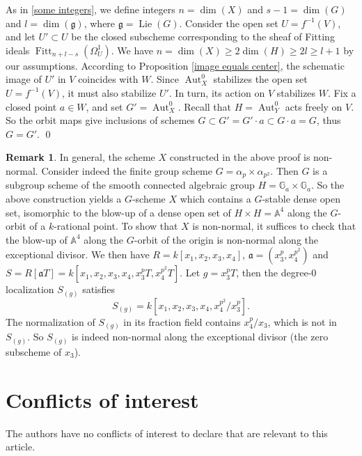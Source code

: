 \documentclass[oneside, 12pt]{amsart}
\theoremstyle{definition}
\newtheorem{remark}[theorem]{Remark}
\theoremstyle{remark}
\renewcommand{\AA}{\mathbb{A}}
\newcommand{\GG}{\mathbb{G}}
\newcommand{\ideala}{\mathfrak{a}}
\newcommand{\Aut}{\operatorname{Aut}}
\newcommand{\Fitt}{\operatorname{Fitt}}
\newcommand{\Lie}{\operatorname{Lie}}
\newcommand{\lieg}{\mathfrak{g}}
\begin{document}
As in \eqref{some integers}, we define integers  
$n=\dim(X)$ and $s-1=\dim(G)$ 
and $l=\dim(\lieg)$, where $\lieg=\Lie(G)$.
Consider the open set $U=f^{-1}(V)$, and let $U'\subset U$ 
be the closed subscheme corresponding 
to the sheaf of Fitting ideals $\Fitt_{n+ l-s}(\Omega^1_U)$. 
We have $n=\dim(X) \geq  2\dim(H)\geq 2l \geq l+1$ by our assumptions.
According to Proposition \ref{image equals center}, 
the schematic image of $U'$ in $V$ coincides with $W$.
Since $\Aut^0_X$ stabilizes the open set $U=f^{-1}(V)$, it must also stabilize $U'$.
In turn, its action on $V$ stabilizes $W$. 
Fix a closed point $a\in W$, and set $G'=\Aut_X^0$.
Recall that $H=\Aut_Y^0$ acts freely on $V$. 
So the orbit maps give inclusions of schemes 
$G\subset G'=G'\cdot a\subset G\cdot a=G$, thus $G=G'$.
\qed


\begin{remark}
\label{rem:nonnormal}
In general, the scheme $X$ constructed in the above proof 
is non-normal. Consider indeed the finite group scheme
$G = \alpha_p \times \alpha_{p^2}$. Then
$G$ is a subgroup scheme of the smooth connected algebraic 
group $H = \GG_a \times \GG_a$. So the above construction 
yields a $G$-scheme $X$ which contains a $G$-stable dense 
open set, isomorphic to the blow-up of 
a dense open set of $H \times H = \AA^4$ along the 
$G$-orbit of a $k$-rational point. To show that $X$ is
non-normal, it suffices to check that the blow-up of
$\AA^4$ along the $G$-orbit of the origin is non-normal
along the exceptional divisor. We then have
$R = k[x_1,x_2,x_3,x_4]$, 
$\ideala = (x_3^p, x_4^{p^2})$ and
$S = R[\ideala T] 
= k[x_1,x_2,x_3,x_4, x_3^p T, x_4^{p^2} T]$.
Let $g = x_3^p T$, then the degree-$0$ localization
$S_{(g)}$ satisfies
\[ S_{(g)} = k[x_1,x_2,x_3,x_4,x_4^{p^2}/x_3^p]. \]
The normalization of $S_{(g)}$ in its fraction field contains 
$x_4^p/x_3$, which is not in $S_{(g)}$. So $S_{(g)}$
is indeed non-normal along the exceptional divisor
(the zero subscheme of $x_3$).
\end{remark}


\section{Conflicts of interest}

The authors have no conflicts of interest to declare that are relevant to this article.
\end{document}
